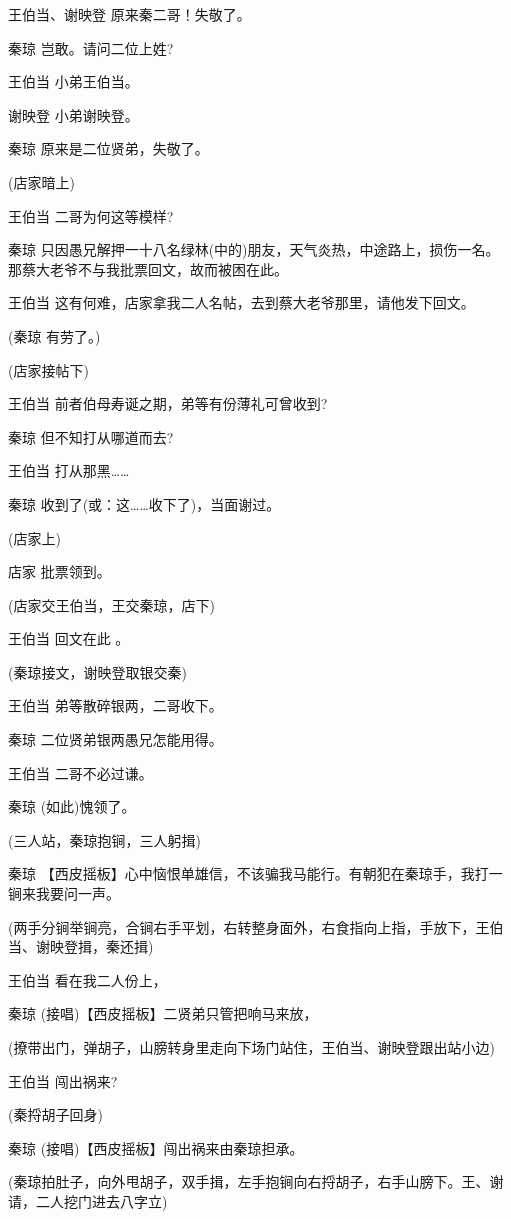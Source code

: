 王伯当、谢映登 原来秦二哥！失敬了。

秦琼 岂敢。请问二位上姓?

王伯当 小弟王伯当。

谢映登 小弟谢映登。

秦琼 原来是二位贤弟，失敬了。

(店家暗上)

王伯当 二哥为何这等模样?

秦琼
只因愚兄解押一十八名绿林(中的)朋友，天气炎热，中途路上，损伤一名。那蔡大老爷不与我批票回文，故而被困在此。

王伯当 这有何难，店家拿我二人名帖，去到蔡大老爷那里，请他发下回文。

(秦琼 有劳了。)

(店家接帖下)

王伯当 前者伯母寿诞之期，弟等有份薄礼可曾收到?

秦琼 但不知打从哪道而去?

王伯当 打从那黑\ldots{}\ldots{}

秦琼 收到了(或：这\ldots{}\ldots{}收下了)，当面谢过。

(店家上)

店家 批票领到。

(店家交王伯当，王交秦琼，店下)

王伯当 回文在此 。

(秦琼接文，谢映登取银交秦)

王伯当 弟等散碎银两，二哥收下。

秦琼 二位贤弟银两愚兄怎能用得。

王伯当 二哥不必过谦。

秦琼 (如此)愧领了。

(三人站，秦琼抱锏，三人躬揖)

秦琼
【西皮摇板】心中恼恨单雄信，不该骗我马能行。有朝犯在秦琼手，我打一锏来我要问一声。

(两手分锏举锏亮，合锏右手平划，右转整身面外，右食指向上指，手放下，王伯当、谢映登揖，秦还揖)

王伯当 看在我二人份上，

秦琼 (接唱)【西皮摇板】二贤弟只管把响马来放，

(撩带出门，弹胡子，山膀转身里走向下场门站住，王伯当、谢映登跟出站小边)

王伯当 闯出祸来?

(秦捋胡子回身)

秦琼 (接唱)【西皮摇板】闯出祸来由秦琼担承。

(秦琼拍肚子，向外甩胡子，双手揖，左手抱锏向右捋胡子，右手山膀下。王、谢请，二人挖门进去八字立)

